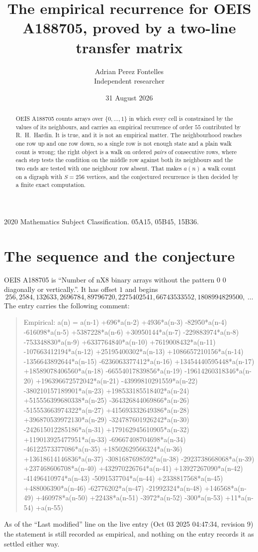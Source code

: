 \documentclass[11pt,a4paper]{article}
\title{The empirical recurrence for OEIS A188705, proved by a two-line transfer matrix}
\author{Adrian Perez Fontelles\\ \small Independent researcher}
\date{31 August 2026}
\theoremstyle{plain}
\theoremstyle{definition}
\begin{document}
\maketitle

\begin{abstract}
OEIS A188705 counts arrays over $\{0,\dots,1\}$ in which every cell is constrained by the
values of its neighbours, and carries an empirical recurrence of order $55$ contributed
by R.~H.~Hardin. It is true, and it is not an empirical matter. The neighbourhood reaches one
row up and one row down, so a single row is not enough state and a plain walk count
is wrong; the right object is a walk on ordered \emph{pairs} of consecutive rows, where
each step tests the condition on the middle row against both its neighbours and the two
ends are tested with one neighbour row absent. That makes $a(n)$ a walk count on a digraph
with $S=256$ vertices, and the conjectured recurrence is then decided by a finite exact
computation.
\end{abstract}

\noindent\small 2020 Mathematics Subject Classification. 05A15, 05B45, 15B36.\normalsize

\section{The sequence and the conjecture}

OEIS A188705 is ``Number of nX8 binary arrays without the pattern 0 0 diagonally or vertically.''. It has offset $1$ and begins
\[
256, 2584, 132633, 2696784, 89796720, 2275402541, 66743533552, 1808994829500,\ \dots
\]
The entry carries the following comment:
\begin{quote}\small
Empirical: a(n) = a(n-1) +696*a(n-2) +4936*a(n-3) -82950*a(n-4) -616098*a(n-5) +5387228*a(n-6) +30950144*a(n-7) -229883974*a(n-8) -753348830*a(n-9) +6337764840*a(n-10) +7619008432*a(n-11) -107663412194*a(n-12) +25195400302*a(n-13) +1086657210156*a(n-14) -1356643892644*a(n-15) -6236063377412*a(n-16) +13454440595448*a(n-17) +18589078406560*a(n-18) -66554017839856*a(n-19) -19614260318346*a(n-20) +196396672572042*a(n-21) -43999810291559*a(n-22) -380210157189901*a(n-23) +198533185518402*a(n-24) +515556399680338*a(n-25) -364326844069866*a(n-26) -515553663974322*a(n-27) +415693332649386*a(n-28) +396870539972130*a(n-29) -324787601926242*a(n-30) -242615012285186*a(n-31) +179162945610905*a(n-32) +119013925477951*a(n-33) -69667408704698*a(n-34) -46122573377086*a(n-35) +18502629566324*a(n-36) +13618614146836*a(n-37) -3081687698592*a(n-38) -2923738668068*a(n-39) +237468606708*a(n-40) +432970226764*a(n-41) +13927267090*a(n-42) -41496410974*a(n-43) -5091537704*a(n-44) +2338817568*a(n-45) +488006390*a(n-46) -62776202*a(n-47) -21992324*a(n-48) +146568*a(n-49) +460978*a(n-50) +22438*a(n-51) -3972*a(n-52) -300*a(n-53) +11*a(n-54) +a(n-55)
\end{quote}
As of the ``Last modified'' line on the live entry (Oct 03 2025 04:47:34, revision 9) the statement is
still recorded as empirical, and nothing on the entry records it as settled either way.
\end{document}
